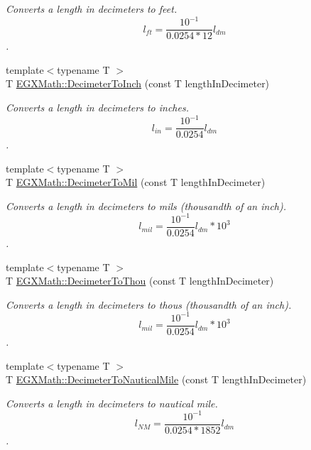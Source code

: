 \begin{DoxyCompactItemize}
\begin{DoxyCompactList}\small\item\em Converts a length in decimeters to feet. \[ l_{ft}= \frac{10^{-1}}{0.0254 * 12} l_{dm} \]. \end{DoxyCompactList}\item 
{\footnotesize template$<$typename T $>$ }\\T \mbox{\hyperlink{group___e_g_x_math-_conversions-_length_conversions-_s_i-_decimeter-_imperial_ga51bb6347b1c3ca746b7a3eadc3852e37}{E\+G\+X\+Math\+::\+Decimeter\+To\+Inch}} (const T length\+In\+Decimeter)
\begin{DoxyCompactList}\small\item\em Converts a length in decimeters to inches. \[ l_{in}= \frac{10^{-1}}{0.0254} l_{dm} \]. \end{DoxyCompactList}\item 
{\footnotesize template$<$typename T $>$ }\\T \mbox{\hyperlink{group___e_g_x_math-_conversions-_length_conversions-_s_i-_decimeter-_imperial_gad2ce3f2de1fdda0216bdb56c4844b5e5}{E\+G\+X\+Math\+::\+Decimeter\+To\+Mil}} (const T length\+In\+Decimeter)
\begin{DoxyCompactList}\small\item\em Converts a length in decimeters to mils (thousandth of an inch). \[ l_{mil}= \frac{10^{-1}}{0.0254} l_{dm} * 10^{3} \]. \end{DoxyCompactList}\item 
{\footnotesize template$<$typename T $>$ }\\T \mbox{\hyperlink{group___e_g_x_math-_conversions-_length_conversions-_s_i-_decimeter-_imperial_gafc294e549fcdd1c43545ca9624abcafb}{E\+G\+X\+Math\+::\+Decimeter\+To\+Thou}} (const T length\+In\+Decimeter)
\begin{DoxyCompactList}\small\item\em Converts a length in decimeters to thous (thousandth of an inch). \[ l_{mil}= \frac{10^{-1}}{0.0254} l_{dm} * 10^{3} \]. \end{DoxyCompactList}\item 
{\footnotesize template$<$typename T $>$ }\\T \mbox{\hyperlink{group___e_g_x_math-_conversions-_length_conversions-_s_i-_decimeter-_nautical_ga6cc0e9987da30da6a30ddba50971ba2d}{E\+G\+X\+Math\+::\+Decimeter\+To\+Nautical\+Mile}} (const T length\+In\+Decimeter)
\begin{DoxyCompactList}\small\item\em Converts a length in decimeters to nautical mile. \[ l_{NM}= \frac{10^{-1}}{0.0254 * 1852} l_{dm} \]. \end{DoxyCompactList}\item 

\end{DoxyCompactItemize}
